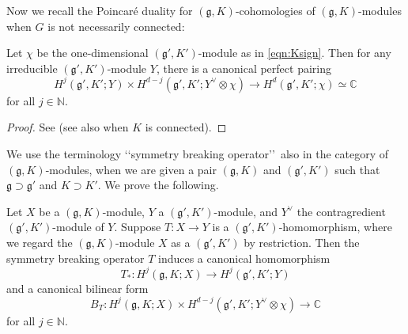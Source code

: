 Now we recall the Poincar{\'e} duality
 for $({\mathfrak{g}}, K)$-cohomologies of $({\mathfrak{g}}, K)$-modules
 when $G$ is not necessarily connected:
\begin{lemma}
\label{lem:Poincare}
Let $\chi$ be the one-dimensional $({\mathfrak{g}}', K')$-module
 as in \eqref{eqn:Ksign}.  
Then for any irreducible $({\mathfrak{g}}', K')$-module $Y$, 
 there is a canonical perfect pairing
\begin{equation}
\label{eqn:Poincare}
   H^j({\mathfrak{g}}', K'; Y) \times H^{d-j}({\mathfrak{g}}', K'; Y^{\vee} \otimes \chi)
\to H^d({\mathfrak{g}}', K'; \chi) \simeq {\mathbb{C}}
\end{equation}
for all $j \in {\mathbb{N}}$.  
\end{lemma}

\begin{proof}
See  \cite[Cor.~3.6]{KV}
 (see also \cite[Chap.~I, Sect.~1]{BW}
 when $K$ is connected).  
\end{proof}

We use the terminology 
 \lq\lq{symmetry breaking operator}\rq\rq\
 also in the category
 of $({\mathfrak{g}},K)$-modules, 
 when  we are given a pair $({\mathfrak{g}},K)$ and $({\mathfrak{g}}',K')$
 such that ${\mathfrak{g}} \supset {\mathfrak{g}}'$ and $K \supset K'$. 
We prove the following.  
\begin{proposition}
\label{prop:171543}
Let $X$ be a $({\mathfrak{g}}, K)$-module,
 $Y$ a $({\mathfrak{g}}', K')$-module,
 and $Y^{\vee}$ the contragredient $({\mathfrak{g}}', K')$-module
 of $Y$.  
Suppose $T\colon X \to Y$ is a $({\mathfrak{g}}', K')$-homomorphism, 
 where we regard the $({\mathfrak{g}}, K)$-module $X$
 as a $({\mathfrak{g}}', K')$ by restriction.  
Then the symmetry breaking operator $T$ induces a canonical homomorphism
\begin{equation}
\label{eqn:cohmap}
T_{\ast} \colon H^j({\mathfrak{g}}, K; X) \to H^j({\mathfrak{g}}', K'; Y)
\end{equation}
and a canonical bilinear form
\begin{equation}
\label{eqn:cohbi}
   B_T \colon 
   H^j({\mathfrak{g}}, K; X) \times H^{d-j}({\mathfrak{g}}', K'; Y^{\vee} \otimes \chi)
   \to 
  {\mathbb{C}}
\end{equation}
for all $j \in {\mathbb{N}}$.
\end{proposition}

